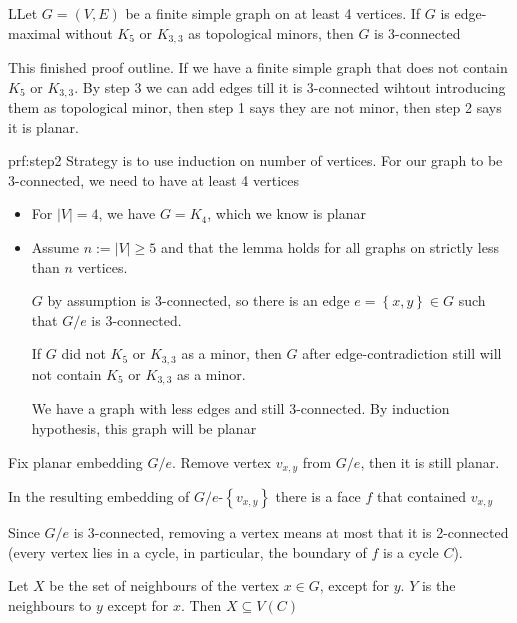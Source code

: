 \par\bigskip
\begin{lem}
  LLet $G = (V,E)$ be a finite simple graph on at least 4 vertices. If $G$ is edge-maximal without $K_5$ or $K_{3,3}$ as topological minors, then $G$ is 3-connected 
\end{lem}
\par\bigskip
\noindent This finished proof outline. If we have a finite simple graph that does not contain $K_5$ or $K_{3,3}$. By step 3 we can add edges till it is 3-connected wihtout introducing them as topological minor, then step 1 says they are not minor, then step 2 says it is planar.
\newpage
\begin{prf}[Step 2]{prf:step2}
  Strategy is to use induction on number of vertices. For our graph to be 3-connected, we need to have at least 4 vertices
  \par\bigskip
  \begin{itemize}
    \item For $\left|V\right| = 4$, we have $G = K_4$, which we know is planar\par
    \item Assume $n:=\left|V\right|\geq 5$ and that the lemma holds for all graphs on strictly less than $n$ vertices.
      \par\bigskip
    \noindent $G$ by assumption is 3-connected, so there is an edge $e = \left\{x,y\right\}\in G$ such that $G/e$ is 3-connected.
    \par\bigskip
    \noindent If $G$ did not $K_5$ or $K_{3,3}$ as a minor, then $G$ after edge-contradiction still will not contain $K_5$ or $K_{3,3}$ as a minor.
    \par\bigskip
    \noindent We have a graph with less edges and still 3-connected. By induction hypothesis, this graph will be planar 
  \end{itemize}
  \par\bigskip
  \noindent Fix planar embedding $G/e$. Remove vertex $v_{x,y}$  from $G/e$, then it is still planar.\par
  \noindent In the resulting embedding of $G/e$-$\left\{v_{x,y}\right\}$ there is a face $f$ that contained $v_{x,y}$
  \par\bigskip
  \noindent Since $G/e$ is 3-connected, removing a vertex means at most that it is 2-connected (every vertex lies in a cycle, in particular, the boundary of $f$ is a cycle $C$).
  \par\bigskip
  \noindent Let $X$ be the set of neighbours of the vertex $x\in G$, except for $y$. $Y$ is the neighbours to $y$ except for $x$. Then $X\subseteq V(C)$

\end{prf}
